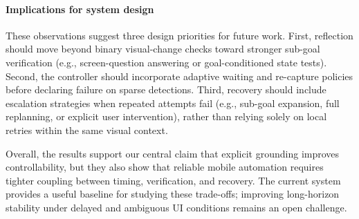\paragraph{Implications for system design}
These observations suggest three design priorities for future work. First, reflection should move beyond binary visual-change checks toward stronger sub-goal verification (e.g., screen-question answering or goal-conditioned state tests). Second, the controller should incorporate adaptive waiting and re-capture policies before declaring failure on sparse detections. Third, recovery should include escalation strategies when repeated attempts fail (e.g., sub-goal expansion, full replanning, or explicit user intervention), rather than relying solely on local retries within the same visual context.

Overall, the results support our central claim that explicit grounding improves controllability, but they also show that reliable mobile automation requires tighter coupling between timing, verification, and recovery. The current system provides a useful baseline for studying these trade-offs; improving long-horizon stability under delayed and ambiguous UI conditions remains an open challenge.
